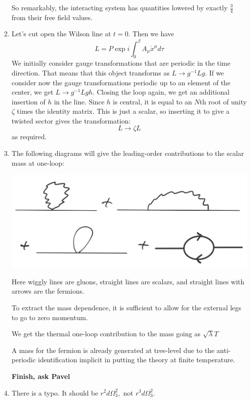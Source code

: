 \documentclass[11pt, class=article, crop=false]{standalone}
\begin{document}
\begin{enumerate}
	
	So remarkably, the interacting system has quantities lowered by exactly $\frac34$ from their free field values. 
	
	\item Let's cut open the Wilson line at $t=0$. Then we have 
	\[
		L = P \exp i \int_0^\beta A_\mu \dot x^\mu d\tau
	\]
	We initially consider gauge transformations that are periodic in the time direction. That means that this object transforms as $L \to g^{-1} L g$. If we consider now the gauge transformations periodic up to an element of the center, we get $L \to g^{-1} L g h$. Closing the loop again, we get an additional insertion of $h$ in the line. Since $h$ is central, it is equal to an $N$th root of unity $\zeta$ times the identity matrix. This is just a scalar, so inserting it to give a twisted sector gives the transformation:
	\[
		L \to \zeta L
	\]
	as required. 
	
	\item The following diagrams will give the leading-order contributions to the scalar mass at one-loop:
	
	\begin{center}
		\includegraphics[scale=0.3]{"Drawings/Thermal Mass"}
	\end{center}
	Here wiggly lines are gluons, straight lines are scalars, and straight lines with arrows are the fermions. 
	
	To extract the mass dependence, it is sufficient to allow for the external legs to go to zero momentum. 
	
	We get the thermal one-loop contribution to the mass going as $\sqrt{\lambda} T$
	
	A mass for the fermion is already generated at tree-level due to the anti-periodic identification implicit in putting the theory at finite temperature. 
	
	\textbf{Finish, ask Pavel}
	
	\item There is a typo. It should be $r^2 d\Omega_3^2,$ not $r^3 d\Omega_3^2$.
	

\end{enumerate}
\end{document}
